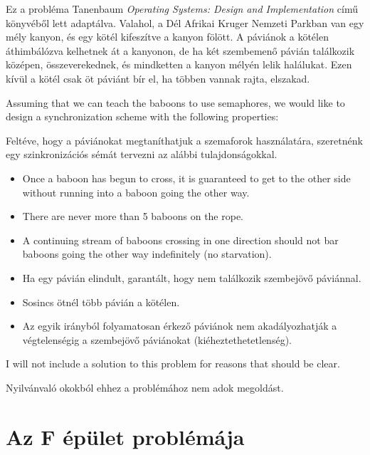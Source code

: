 \documentclass{book}
\begin{document}
Ez a probléma Tanenbaum {\em Operating Systems:
Design and Implementation} \cite{tanenbaum} című könyvéből lett adaptálva.
Valahol, a Dél Afrikai Kruger Nemzeti Parkban van egy mély kanyon,
és egy kötél kifeszítve a kanyon fölött.
A páviánok a kötélen áthimbálózva kelhetnek át a kanyonon, de ha
két szembemenő  pávián találkozik középen, összeverekednek,
és mindketten a kanyon mélyén lelik halálukat.
Ezen kívül a kötél csak öt páviánt bír el, ha többen vannak
rajta, elszakad.
 
Assuming that we can teach the baboons to use semaphores, we
would like to design a synchronization scheme with the following
properties:

Feltéve, hogy a páviánokat megtaníthatjuk a szemaforok használatára,
szeretnénk egy szinkronizációs sémát tervezni az alábbi tulajdonságokkal.

\begin{itemize}

\item Once a baboon has begun to cross, it is guaranteed
to get to the other side without running into a baboon going
the other way.

\item There are never more than 5 baboons on the rope.

\item A continuing stream of baboons crossing in one direction
should not bar baboons going the other way indefinitely
(no starvation).

\end{itemize}

\begin{itemize}

\item Ha egy pávián elindult, garantált, hogy nem találkozik szembejövő
páviánnal.

\item Sosincs ötnél több pávián a kötélen.

\item Az egyik irányból folyamatosan érkező páviánok nem
akadályozhatják a végtelenségig a szembejövő páviánokat
(kiéheztethetetlenség).

\end{itemize}

I will not include a solution to this problem for reasons that
should be clear.

Nyilvánvaló okokból ehhez a problémához nem adok megoldást.

\section{Az F épület problémája}
\end{document}
